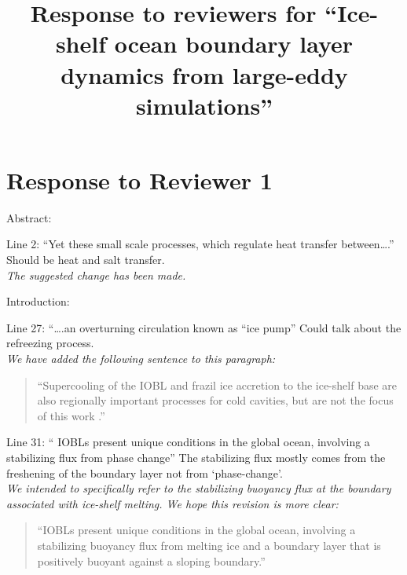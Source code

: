 \documentclass[tc, manuscript]{copernicus}
\begin{document}
\title{Response to reviewers for ``Ice-shelf ocean boundary layer dynamics from large-eddy simulations''}







\maketitle

\section{Response to Reviewer 1}

Abstract:\vspace{12pt}

Line 2: “Yet these small scale processes, which regulate heat transfer between….” Should be heat and salt transfer.\\
\textit{The suggested change has been made.}\vspace{12pt}

Introduction:\vspace{12pt}

Line 27: “….an overturning circulation known as “ice pump” Could talk about the refreezing process.\\
\textit{We have added the following sentence to this paragraph:}
\begin{quote}
``Supercooling of the IOBL and frazil ice accretion to the ice-shelf base are also regionally important processes for cold cavities, but are not the focus of this work \citep{galton-fenzi_modeling_2012, jordan_conditional_2015}.''
\end{quote}\vspace{12pt}

Line 31: “ IOBLs present unique conditions in the global ocean, involving a stabilizing flux from phase change” The stabilizing flux mostly comes from the freshening of the boundary layer not from ‘phase-change’.\\
\textit{We intended to specifically refer to the stabilizing buoyancy flux at the boundary associated with ice-shelf melting. We hope this revision is more clear:}
\begin{quote}
``IOBLs present unique conditions in the global ocean, involving a stabilizing buoyancy flux from melting ice and a boundary layer that is positively buoyant against a sloping boundary.''    
\end{quote}\vspace{12pt}
\end{document}
